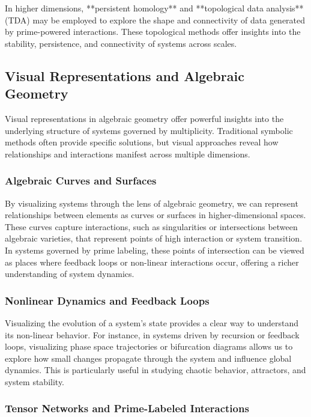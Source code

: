 \documentclass[12pt]{article}
\begin{document}
In higher dimensions, **persistent homology** and **topological data analysis** (TDA) may be employed to explore the shape and connectivity of data generated by prime-powered interactions. These topological methods offer insights into the stability, persistence, and connectivity of systems across scales.



\subsection{Visual Representations and Algebraic Geometry}

Visual representations in algebraic geometry offer powerful insights into the underlying structure of systems governed by multiplicity. Traditional symbolic methods often provide specific solutions, but visual approaches reveal how relationships and interactions manifest across multiple dimensions.

\subsubsection{Algebraic Curves and Surfaces}

By visualizing systems through the lens of algebraic geometry, we can represent relationships between elements as curves or surfaces in higher-dimensional spaces. These curves capture interactions, such as singularities or intersections between algebraic varieties, that represent points of high interaction or system transition. In systems governed by prime labeling, these points of intersection can be viewed as places where feedback loops or non-linear interactions occur, offering a richer understanding of system dynamics.

\subsubsection{Nonlinear Dynamics and Feedback Loops}

Visualizing the evolution of a system’s state provides a clear way to understand its non-linear behavior. For instance, in systems driven by recursion or feedback loops, visualizing phase space trajectories or bifurcation diagrams allows us to explore how small changes propagate through the system and influence global dynamics. This is particularly useful in studying chaotic behavior, attractors, and system stability.

\subsubsection{Tensor Networks and Prime-Labeled Interactions}
\end{document}
